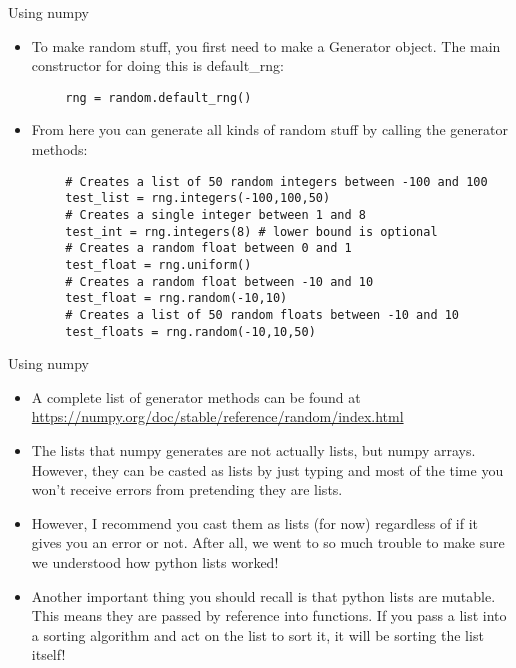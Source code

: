 \documentclass{beamer}
\begin{document}
\begin{frame}[fragile]{Using numpy}
    \begin{itemize}
        \item To make random stuff, you first need to make a Generator object. The main constructor for doing this is default\_rng:
    \end{itemize}
    \begin{verbatim}
        rng = random.default_rng()
    \end{verbatim}
    \begin{itemize}
        \item From here you can generate all kinds of random stuff by calling the generator methods:
    \end{itemize}
    \begin{verbatim}
        # Creates a list of 50 random integers between -100 and 100
        test_list = rng.integers(-100,100,50)
        # Creates a single integer between 1 and 8
        test_int = rng.integers(8) # lower bound is optional
        # Creates a random float between 0 and 1
        test_float = rng.uniform()
        # Creates a random float between -10 and 10
        test_float = rng.random(-10,10)
        # Creates a list of 50 random floats between -10 and 10
        test_floats = rng.random(-10,10,50)
    \end{verbatim}
\end{frame}

\begin{frame}[fragile]{Using numpy}
    \begin{itemize}
        \item A complete list of generator methods can be found at \url{https://numpy.org/doc/stable/reference/random/index.html}
        \item The lists that numpy generates are not actually lists, but numpy arrays. However, they can be casted as lists by just typing and most of the time you won't receive errors from pretending they are lists.
        \item However, I recommend you cast them as lists (for now) regardless of if it gives you an error or not. After all, we went to so much trouble to make sure we understood how python lists worked!
        \item Another important thing you should recall is that python lists are mutable. This means they are passed by reference into functions. If you pass a list into a sorting algorithm and act on the list to sort it, it will be sorting the list itself! 
    \end{itemize}
\end{frame}
\end{document}
